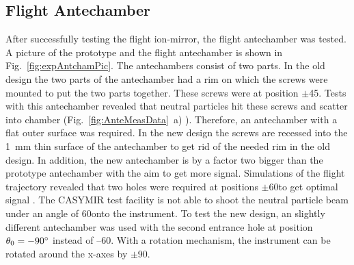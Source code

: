 	\subsection{Flight Antechamber } \label{subsec:ExpAnteCham}
	After successfully testing the flight ion-mirror, the flight antechamber was tested. A picture of the prototype and the flight antechamber is shown in Fig.~\ref{fig:expAntchamPic}. The antechambers consist of two parts. In the old design the two parts of the antechamber had a rim on which the screws were mounted to put the two parts together. These screws were at position $\pm$45\degree. Tests with this antechamber revealed that neutral particles hit these screws and scatter into chamber (Fig.~\ref{fig:AnteMeasData}~a) \cite{Meyer_2017_ante}). Therefore, an antechamber with a flat outer surface was required. In the new design the screws are recessed into the 1~mm thin surface of the antechamber to get rid of the needed rim in the old design. In addition, the new antechamber is by a factor two bigger than the prototype antechamber with the aim to get more signal. Simulations of the flight trajectory revealed that two holes were required at positions $\pm$60\degree to get optimal signal \cite{SOC_Crema3p2}. The CASYMIR test facility is not able to shoot the neutral particle beam under an angle of 60\degree onto the instrument. To test the new design, an slightly different antechamber was used with the second entrance hole at position $\theta_0 = -90^\circ$ instead of --60\degree. With a rotation mechanism, the instrument can be rotated around the x-axes by $\pm$90\degree.\\
